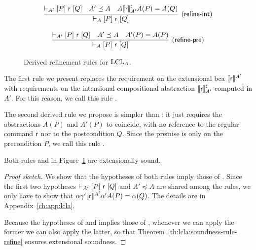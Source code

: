 \begin{figure}[t]
	\begin{framed}
		\[
		\infer[\lclrule{refine\mbox{-}int}]
		{\lcl{A}{P}{\regr}{Q}}
		{\lcl{A'}{P}{\regr}{Q} \quad A' \preceq A \quad A \denot{\regr}^{\sharp}_{A'} A(P) = A(Q) }
		\]

		\[
		\infer[\lclrule{refine\mbox{-}pre}]
		{\lcl{A}{P}{\regr}{Q}}
		{\lcl{A'}{P}{\regr}{Q} \quad A' \preceq A \quad A'(P) = A(P) }
		\]
	\end{framed}
	\vspace{-1ex}
	\caption{Derived refinement rules for $\text{LCL}_A$.}\label{fig:lcla:rules-refine-derived}
\end{figure}

The first rule we present replaces the requirement on the extensional bca $\llbracket\mathsf{r}\rrbracket^{A'}$ with requirements on the intensional compositional abstraction $\llbracket\mathsf{r}\rrbracket^{\sharp}_{A'}$ computed in $A'$. For this reason, we call this rule .

The second derived rule we propose is simpler than : it just requires the abstractions $A(P)$ and $A'(P)$ to coincide, with no reference to the regular command $\mathsf{r}$ nor to the postcondition $Q$. Since the premise is only on the precondition $P$, we call this rule .

\begin{prop}\label{th:lcla:refine-derived-sound}
	Both rules  and  in Figure~\ref{fig:lcla:rules-refine-derived} are extensionally sound.
\end{prop}
\begin{proof}[Proof sketch]
	We show that the hypotheses of both rules imply those of . Since the first two hypotheses $\vdash_{A'}\nobreak[P]~\mathsf{r}~[Q]$ and $A' \preceq A$ are shared among the rules, we only have to show that $\alpha \gamma' \llbracket\mathsf{r}\rrbracket^{A'} \alpha' A(P) = \alpha(Q)$. The details are in Appendix~\ref{ch:app:lcla}.

	Because the hypotheses of  and  implies those of , whenever we can apply the former we can also apply the latter, so that Theorem~\ref{th:lcla:soundness-rule-refine} ensures extensional soundness.
\end{proof}

